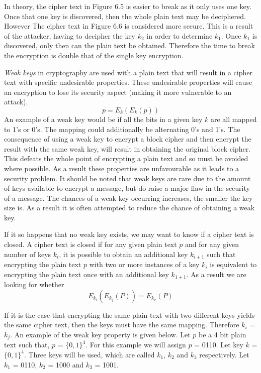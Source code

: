 \documentclass[11pt,a4paper, notitlepage]{report}
\begin{document}
In theory, the cipher text in Figure 6.5 is easier to break as it only uses one key. Once that one key is discovered, then the whole plain text may be deciphered. However The cipher text in Figure 6.6 is considered more secure. This is a result of the attacker, having to decipher the key $k_{2}$ in order to determine $k_{1}$. Once $k_{1}$ is discovered, only then can the plain text be obtained. Therefore the time to break the encryption is double that of the single key encryption. 

\emph{Weak keys} in cryptography are used with a plain text that will result in a cipher text with specific undesirable properties. These undesirable properties will cause an encryption to lose its security aspect (making it more vulnerable to an attack).  
\begin{displaymath}
p = E_{k}(E_{k}(p))
\end{displaymath}
An example of a weak key would be if all the bits in a given key $k$ are all mapped to 1's or 0's. The mapping could additionally be alternating 0's and 1's. The consequence of using a weak key to encrypt a block cipher and then encrypt the result with the same weak key, will result in obtaining the original block cipher. This defeats the whole point of encrypting a plain text and so must be avoided where possible. As a result these properties are unfavourable as it leads to a security problem. It should be noted that weak keys are rare due to the amount of keys available to encrypt a message, but do raise a major flaw in the security of a message. The chances of a weak key occurring increases, the smaller the key size is. As a result it is often attempted to reduce the chance of obtaining a weak key.

If it so happens that no weak key exists, we may want to know if a cipher text is closed. A cipher text is closed if for any given plain text $p$ and for any given number of keys $k_{i}$, it is possible to obtain an additional key $k_{i+1}$ such that encrypting the plain text $p$ with two or more instances of a key $k_{i}$ is equivalent to encrypting the plain text once with an additional key $k_{1+1}$. As a result we are looking for whether
\begin{displaymath}
E_{k_i}(E_{k_{j}}(P)) = E_{k_{x}}(P)
\end{displaymath} 

If it is the case that encrypting the same plain text with two different keys yields the same cipher text, then the keys must have the same mapping. Therefore $k_{i}$ = $k_{j}$. An example of the weak key property is given below. 
Let $p$ be a 4 bit plain text such that, $p$ = $\{0,1\}^{4}$. For this example we will assign $p$ = 0110. Let key $k$ = $\{0,1\}^{4}$. Three keys will be used, which are called $k_{1}$, $k_{2}$ and $k_{3}$ respectively. Let $k_{1}$ = 0110, $k_{2}$ = 1000 and $k_{3}$ = 1001. 
\end{document}
